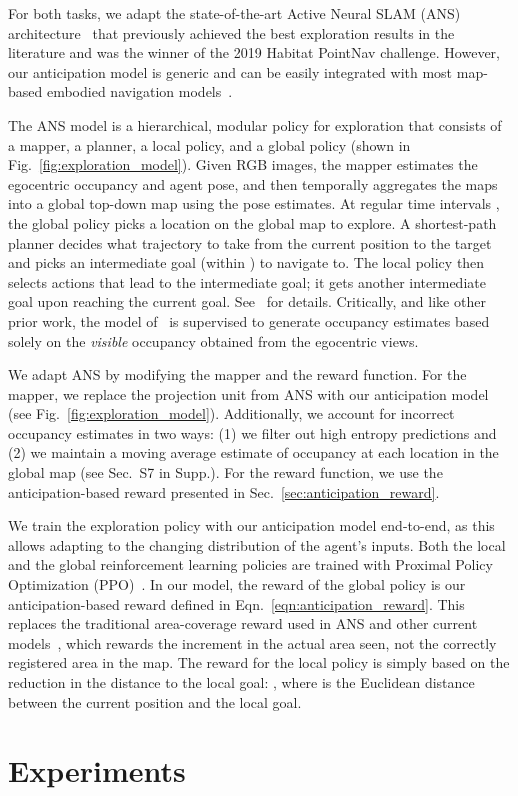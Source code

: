 \documentclass[runningheads]{llncs}
\begin{document}
For both tasks, we adapt the state-of-the-art Active Neural SLAM (ANS) architecture~\cite{chaplot2020learning} that previously achieved the best exploration results in the literature and was the winner of the 2019 Habitat PointNav challenge. However, our anticipation model is generic and can be easily integrated with most map-based embodied navigation models~\cite{gupta2017cognitive,chen2019learning,gan2019look}. 

The ANS model is a hierarchical, modular policy for exploration that consists of a mapper, a planner, a local policy, and a global policy (shown in Fig.~\ref{fig:exploration_model}). Given RGB images, the mapper estimates the egocentric occupancy and agent pose, and then temporally aggregates the maps into a global top-down map using the pose estimates. At regular time intervals , the global policy picks a location on the global map to explore. A shortest-path planner decides what trajectory to take from the current position to the target and picks an intermediate goal (within ) to navigate to. The local policy then selects actions that lead to the intermediate goal; it gets another intermediate goal upon reaching the current goal. See~\cite{chaplot2020learning} for details.  Critically, and like other prior work, the model of~\cite{chaplot2020learning} is supervised to generate occupancy estimates based solely on the \emph{visible} occupancy obtained from the egocentric views.

We adapt ANS by modifying the mapper and the reward function. For the mapper, we replace the projection unit from ANS with our anticipation model (see Fig.~\ref{fig:exploration_model}). Additionally, we account for incorrect occupancy estimates in two ways: (1) we filter out high entropy predictions and (2) we maintain a moving average estimate of occupancy at each location in the global map (see Sec.~S7 in Supp.). For the reward function, we use the anticipation-based reward presented in Sec.~\ref{sec:anticipation_reward}.

We train the exploration policy with our anticipation model end-to-end, as this allows adapting to the changing distribution of the agent's inputs. Both the local and the global reinforcement learning policies are trained with Proximal Policy Optimization (PPO)~\cite{schulman2017proximal}. In our model, the reward of the global policy is our anticipation-based reward defined in Eqn.~\ref{eqn:anticipation_reward}.  This replaces the traditional area-coverage reward used in ANS and other current models~\cite{chen2019learning,chaplot2020learning,ramakrishnan2020exploration}, which rewards the increment in the actual area seen, not the correctly registered area in the map. The reward for the local policy is simply based on the reduction in the distance to the local goal:  ,  where  is the Euclidean distance between the current position and the local goal.  \section{Experiments}
\end{document}
